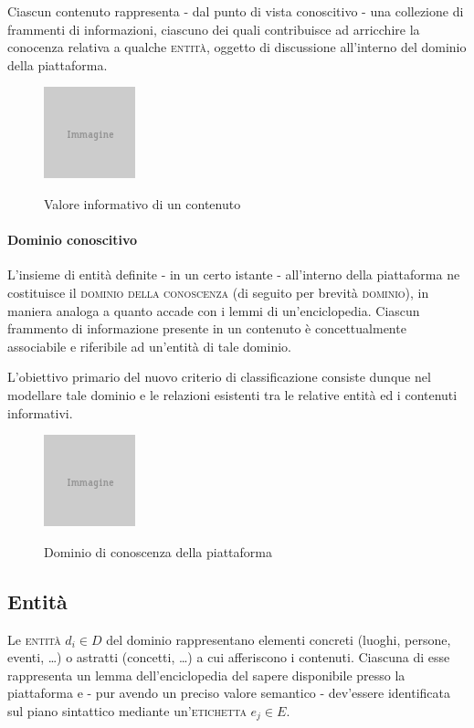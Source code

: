 Ciascun contenuto rappresenta - dal punto di vista conoscitivo - una collezione di frammenti di informazioni, ciascuno dei quali contribuisce ad arricchire la conocenza relativa a qualche \textsc{entità}, oggetto di discussione all'interno del dominio della piattaforma.

\begin{figure}[ht]
\begin{center}
 \includegraphics{placeholder.png}
 \label{fig:tesi:stage:fase-uno:contenuti-informativi}
 \caption{Valore informativo di un contenuto}
\end{center}
\end{figure}

\paragraph{Dominio conoscitivo}
L'insieme di entità definite - in un certo istante - all'interno della piattaforma ne costituisce il \textsc{dominio della conoscenza} (di seguito per brevità \textsc{dominio}), in maniera analoga a quanto accade con i lemmi di un'enciclopedia. Ciascun frammento di informazione presente in un contenuto è concettualmente associabile e riferibile ad un'entità di tale dominio.

L'obiettivo primario del nuovo criterio di classificazione consiste dunque nel modellare tale dominio e le relazioni esistenti tra le relative entità ed i contenuti informativi.

\begin{figure}[ht]
\begin{center}
 \includegraphics{placeholder.png}
 \label{fig:tesi:stage:fase-uno:dominio-conoscenza}
 \caption{Dominio di conoscenza della piattaforma}
\end{center}
\end{figure}

\subsection{Entità}  
Le \textsc{entità} $d_i \in D$ del dominio rappresentano elementi concreti (luoghi, persone, eventi, \ldots) o astratti (concetti, \ldots) a cui afferiscono i contenuti. Ciascuna di esse rappresenta un lemma dell'enciclopedia del sapere disponibile presso la piattaforma e - pur avendo un preciso valore semantico - dev'essere identificata sul piano sintattico mediante un'\textsc{etichetta} $e_j \in E$.

